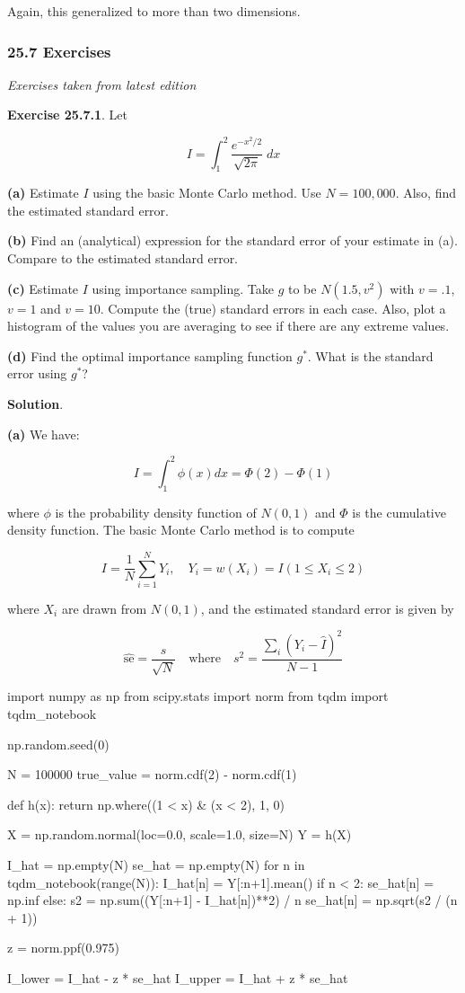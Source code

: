 Again, this generalized to more than two dimensions.

\subsubsection{25.7 Exercises}\label{exercises}

\emph{Exercises taken from latest edition}

\textbf{Exercise 25.7.1}. Let

\[ I = \int_1^2 \frac{e^{-x^2 / 2}}{\sqrt{2 \pi}} \; dx \]

\textbf{(a)} Estimate \(I\) using the basic Monte Carlo method. Use
\(N = 100,000\). Also, find the estimated standard error.

\textbf{(b)} Find an (analytical) expression for the standard error of
your estimate in (a). Compare to the estimated standard error.

\textbf{(c)} Estimate \(I\) using importance sampling. Take \(g\) to be
\(N(1.5, v^2)\) with \(v = .1\), \(v = 1\) and \(v = 10\). Compute the
(true) standard errors in each case. Also, plot a histogram of the
values you are averaging to see if there are any extreme values.

\textbf{(d)} Find the optimal importance sampling function \(g^*\). What
is the standard error using \(g^*\)?

\textbf{Solution}.

\textbf{(a)} We have:

\[ I = \int_1^2 \phi(x) dx = \Phi(2) - \Phi(1) \]

where \(\phi\) is the probability density function of \(N(0, 1)\) and
\(\Phi\) is the cumulative density function. The basic Monte Carlo
method is to compute

\[ I = \frac{1}{N} \sum_{i=1}^N Y_i,
\quad Y_i = w(X_i) = I(1 \leq X_i \leq 2)
\]

where \(X_i\) are drawn from \(N(0, 1)\), and the estimated standard
error is given by

\[ \hat{\text{se}} = \frac{s}{\sqrt{N}} 
\quad \text{where} \quad
s^2 = \frac{\sum_i (Y_i - \hat{I})^2}{N - 1}
\]

\begin{python}
import numpy as np
from scipy.stats import norm
from tqdm import tqdm_notebook

np.random.seed(0)

N = 100000
true_value = norm.cdf(2) - norm.cdf(1)

def h(x):
    return np.where((1 < x) & (x < 2), 1, 0)

X = np.random.normal(loc=0.0, scale=1.0, size=N)
Y = h(X)

I_hat = np.empty(N)
se_hat = np.empty(N)
for n in tqdm_notebook(range(N)):
    I_hat[n] = Y[:n+1].mean()
    if n < 2:
        se_hat[n] = np.inf
    else:
        s2 = np.sum((Y[:n+1] - I_hat[n])**2) / n
        se_hat[n] = np.sqrt(s2 / (n + 1))
        
z = norm.ppf(0.975)

I_lower = I_hat - z * se_hat
I_upper = I_hat + z * se_hat
\end{python}

